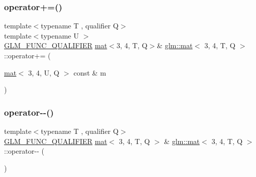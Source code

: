\subsubsection{\texorpdfstring{operator+=()}{operator+=()}\hspace{0.1cm}{\footnotesize\ttfamily [4/4]}}
{\footnotesize\ttfamily template$<$typename T , qualifier Q$>$ \\
template$<$typename U $>$ \\
\hyperlink{setup_8hpp_a33fdea6f91c5f834105f7415e2a64407}{G\+L\+M\+\_\+\+F\+U\+N\+C\+\_\+\+Q\+U\+A\+L\+I\+F\+I\+ER} \hyperlink{structglm_1_1mat}{mat}$<$3, 4, T, Q$>$\& \hyperlink{structglm_1_1mat}{glm\+::mat}$<$ 3, 4, T, Q $>$\+::operator+= (\begin{DoxyParamCaption}\item[{\hyperlink{structglm_1_1mat}{mat}$<$ 3, 4, U, Q $>$ const \&}]{m }\end{DoxyParamCaption})}

\mbox{\label{structglm_1_1mat_3_013_00_014_00_01_t_00_01_q_01_4_a127c5f4434bbd959b577ae5dfd808c10}} 
\subsubsection{\texorpdfstring{operator-\/-\/()}{operator--()}\hspace{0.1cm}{\footnotesize\ttfamily [1/2]}}
{\footnotesize\ttfamily template$<$typename T , qualifier Q$>$ \\
\hyperlink{setup_8hpp_a33fdea6f91c5f834105f7415e2a64407}{G\+L\+M\+\_\+\+F\+U\+N\+C\+\_\+\+Q\+U\+A\+L\+I\+F\+I\+ER} \hyperlink{structglm_1_1mat}{mat}$<$ 3, 4, T, Q $>$ \& \hyperlink{structglm_1_1mat}{glm\+::mat}$<$ 3, 4, T, Q $>$\+::operator-\/-\/ (\begin{DoxyParamCaption}{ }\end{DoxyParamCaption})}

\mbox{\label{structglm_1_1mat_3_013_00_014_00_01_t_00_01_q_01_4_a61b4e82bca6ca608b52da28a1ea5333a}} 
